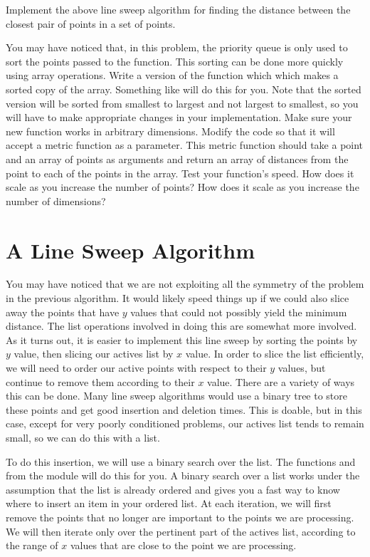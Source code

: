 \begin{problem}
Implement the above line sweep algorithm for finding the distance between the closest pair of points in a set of points.
\end{problem}

\begin{problem}
You may have noticed that, in this problem, the priority queue is only used to sort the points passed to the function. 
This sorting can be done more quickly using array operations. 
Write a version of the function which which makes a sorted copy of the array. 
Something like  will do this for you. 
Note that the sorted version will be sorted from smallest to largest and not largest to smallest, so you will have to make appropriate changes in your implementation.
Make sure your new function works in arbitrary dimensions. 
Modify the code so that it will accept a metric function as a parameter.
This metric function should take a point and an array of points as arguments and return an array of distances from the point to each of the points in the array. 
Test your function's speed. 
How does it scale as you increase the number of points? 
How does it scale as you increase the number of dimensions?
\end{problem}

\section*{A Line Sweep Algorithm}

You may have noticed that we are not exploiting all the symmetry of the problem in the previous algorithm. 
It would likely speed things up if we could also slice away the points that have $y$ values that could not possibly yield the minimum distance. 
The list operations involved in doing this are somewhat more involved. 
As it turns out, it is easier to implement this line sweep by sorting the points by $y$ value, then slicing our actives list by $x$ value.
In order to slice the list efficiently, we will need to order our active points with respect to their $y$ values, but continue to remove them according to their $x$ value. 
There are a variety of ways this can be done. 
Many line sweep algorithms would use a binary tree to store these points and get good insertion and deletion times. 
This is doable, but in this case, except for very poorly conditioned problems, our actives list tends to remain small, so we can do this with a list. 

To do this insertion, we will use a binary search over the list. 
The functions  and  from the  module will do this for you. 
A binary search over a list works under the assumption that the list is already ordered and gives you a fast way to know where to insert an item in your ordered list. 
At each iteration, we will first remove the points that no longer are important to the points we are processing. 
We will then iterate only over the pertinent part of the actives list, according to the range of $x$ values that are close to the point we are processing.

